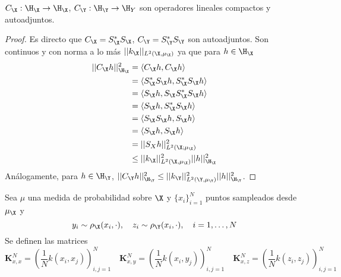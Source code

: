\begin{prop}
    $C_\X : \H_\X \to \H_\X$, $C_\Y : \H_\Y \to \H_Y$ son operadores lineales compactos y autoadjuntos.
\end{prop}

\begin{proof}
    Es directo que $C_\X = S_\X^*S_\X$, $C_\Y = S_\Y^*S_\Y$ son autoadjuntos. Son continuos y con norma a lo más $|| k_\X ||_{L^2(\X, \mu_\X)}$ ya que para $h \in \H_\X$
        \begin{equation*}
            \begin{aligned}
                || C_\X h ||_{\H_\X} ^2
                &= \langle C_\X h, C_\X h \rangle \\
                &= \langle S_\X^*S_\X h, S_\X^*S_\X h \rangle \\
                &= \langle S_\X h, S_\X S_\X^*S_\X h \rangle \\
                &= \langle S_\X h,  S_\X^*S_\X h \rangle \\
                &= \langle S_\X S_\X h,  S_\X h \rangle \\
                &= \langle S_\X h,  S_\X h \rangle \\
                &= || S_X h ||^2_{L^2 (\X; \mu_\X)} \\
                &\leq || k_\X ||^2_{L^2(\X, \mu_\X)} || h ||^2_{\H_\X}
            \end{aligned}
        \end{equation*}
        Análogamente, para $h \in \H_\Y$,  $|| C_\Y h ||_{\H_\Y} ^2 \leq || k_\Y ||^2_{L^2(\Y, \mu_\Y)} || h ||^2_{\H_\Y}$.
\end{proof}




\noindent Sea $\mu$ una medida de probabilidad sobre $\X$ y $\{x_i\}_{i=1}^N$ puntos sampleados desde $\mu_\X$ y 
\begin{equation*}
	y_i \sim \rho_\X (x_i, \cdot), \quad z_i \sim \rho_\Y (x_i, \cdot), \quad i = 1, \dots, N
\end{equation*}
Se definen las matrices
    \begin{equation*}
        \mathbf{K}^N_{x,x} = \left ( \frac{1}{N} k(x_i, x_j) \right )_{i,j = 1}^N
        \quad 
        \mathbf{K}^N_{x,y} = \left ( \frac{1}{N} k(x_i, y_j) \right )_{i,j = 1}^N
        \quad  \mathbf{K}^N_{x,z} = \left ( \frac{1}{N} k(z_i, z_j) \right )_{i,j = 1}^N
    \end{equation*} 

